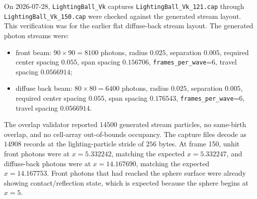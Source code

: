 On 2026-07-28, \texttt{LightingBall\_Vk} captures
\texttt{LightingBall\_Vk\_121.cap} through
\texttt{LightingBall\_Vk\_150.cap} were checked against the generated stream
layout.  This verification was for the earlier flat diffuse-back stream
layout.  The generated photon streams were:
\begin{itemize}
    \item front beam: \(90 \times 90 = 8100\) photons, radius \(0.025\),
          separation \(0.005\), required center spacing \(0.055\), span
          spacing \(0.156706\), \texttt{frames\_per\_wave}=6, travel spacing
          \(0.0566914\);
    \item diffuse back beam: \(80 \times 80 = 6400\) photons, radius
          \(0.025\), separation \(0.005\), required center spacing \(0.055\),
          span spacing \(0.176543\), \texttt{frames\_per\_wave}=6, travel
          spacing \(0.0566914\).
\end{itemize}

The overlap validator reported \(14500\) generated stream particles, no
same-birth overlap, and no cell-array out-of-bounds occupancy.  The capture
files decode as \(14908\) records at the lighting-particle stride of
\(256\) bytes.  At frame 150, unhit front photons were at \(x=5.332242\),
matching the expected \(x=5.332247\), and diffuse-back photons were at
\(x=14.167690\), matching the expected \(x=14.167753\).  Front photons that
had reached the sphere surface were already showing contact/reflection state,
which is expected because the sphere begins at \(x=5\).
